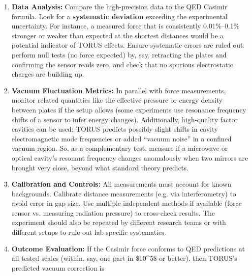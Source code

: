 \documentclass[
]{article}
\begin{document}
{\begin{itemize}
\begin{enumerate}
    check for any unexpected dependence on material or configuration.
    TORUS's recursion fields might interact differently with different
    boundary conditions\hspace{0pt}. Standard theory predicts only
    geometry and distance matter (aside from well-understood material
    corrections); any new dependence could be a TORUS signature.
  \item
    \textbf{Data Analysis:} Compare the high-precision data to the QED
    Casimir formula. Look for a \textbf{systematic deviation} exceeding
    the experimental uncertainty. For instance, a measured force that is
    consistently 0.01\%--0.1\% stronger or weaker than expected at the
    shortest distances would be a potential indicator of TORUS
    effects\hspace{0pt}. Ensure systematic errors are ruled out: perform
    null tests (no force expected) by, say, retracting the plates and
    confirming the sensor reads zero, and check that no spurious
    electrostatic charges are building up.
  \item
    \textbf{Vacuum Fluctuation Metrics:} In parallel with force
    measurements, monitor related quantities like the effective pressure
    or energy density between plates if the setup allows (some
    experiments use resonance frequency shifts of a sensor to infer
    energy changes). Additionally, high-quality factor cavities can be
    used: TORUS predicts possibly slight shifts in cavity
    electromagnetic mode frequencies or added ``vacuum noise'' in a
    confined vacuum region\hspace{0pt}. So, as a complementary test,
    measure if a microwave or optical cavity's resonant frequency
    changes anomalously when two mirrors are brought very close, beyond
    what standard theory predicts.
  \item
    \textbf{Calibration and Controls:} All measurements must account for
    known backgrounds. Calibrate distance measurements (e.g. via
    interferometry) to avoid error in gap size. Use multiple independent
    methods if available (force sensor vs. measuring radiation pressure)
    to cross-check results. The experiment should also be repeated by
    different research teams or with different setups to rule out
    lab-specific systematics.
  \item
    \textbf{Outcome Evaluation:} If the Casimir force conforms to QED
    predictions at all tested scales (within, say, one part in
    \$10\^{}5\$ or better), then TORUS's predicted vacuum correction is

\end{enumerate}
\end{itemize}}
\end{document}
